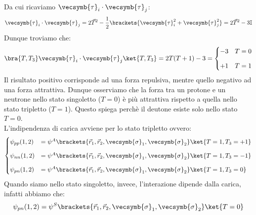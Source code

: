 Da cui ricaviamo $ \vecsymb{\tau}_i \cdot \vecsymb{\tau}_j$:
\begin{equation}
  \vecsymb{\tau}_i \cdot \vecsymb{\tau}_j = 2 \vec{T}^2 - \dfrac{1}{2}\brackets{\vecsymb{\tau}_i^2 + \vecsymb{\tau}_j^2} = 2 \vec{T}^2 - 3\mathbb{I}
\end{equation}
Dunque troviamo che:
\begin{equation}
  \bra{T,T_3} \vecsymb{\tau}_i \cdot \vecsymb{\tau}_j \ket{T,T_3} = 2 T(T+1) - 3 = \begin{cases}
    -3 & T=0 \\[8pt]
    +1 & T=1
  \end{cases}
\end{equation}
Il risultato positivo corrisponde ad una forza repulsiva, mentre quello negativo ad una forza attrattiva. Dunque osserviamo che la forza tra un protone e un neutrone nello stato singoletto ($T=0$) è più attrattiva rispetto a quella nello stato tripletto ($T=1$). Questo spiega perchè il deutone esiste solo nello stato $T=0$.\\
L'indipendenza di carica avviene per lo stato tripletto ovvero:
\begin{equation}
  \begin{cases}
    \psi_{pp}(1,2) &= \psi^A\brackets{\vec{r}_1, \vec{r}_2,\vecsymb{\sigma}_1,\vecsymb{\sigma}_2}\ket{T=1,T_3=+1} \\[8pt]
    \psi_{nn}(1,2) &= \psi^A\brackets{\vec{r}_1, \vec{r}_2,\vecsymb{\sigma}_1,\vecsymb{\sigma}_2}\ket{T=1,T_3=-1} \\[8pt]
    \psi_{pn}(1,2) &= \psi^A\brackets{\vec{r}_1, \vec{r}_2,\vecsymb{\sigma}_1,\vecsymb{\sigma}_2}\ket{T=1,T_3=0}
  \end{cases}
\end{equation}
Quando siamo nello stato singoletto, invece, l'interazione dipende dalla carica, infatti abbiamo che:
\begin{equation}
  \psi_{pn}(1,2) = \psi^S\brackets{\vec{r}_1, \vec{r}_2,\vecsymb{\sigma}_1,\vecsymb{\sigma}_2}\ket{T=0}
\end{equation}
